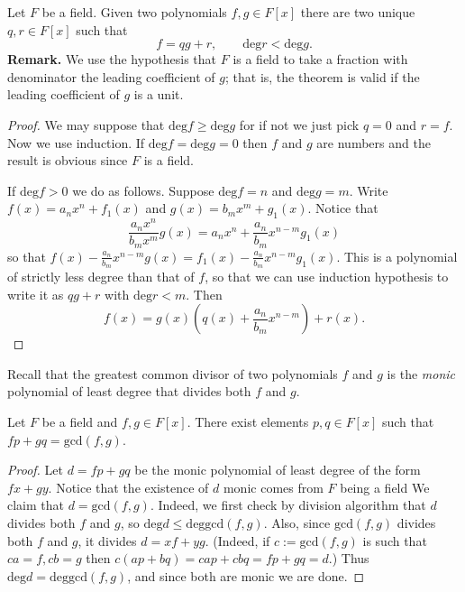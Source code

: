 \begin{theorem}
\label{theorem-division-algoritm-for-polynomials}
\begin{reference}
\cite[Theorem 1.48]{MMST}
\end{reference}
Let $F$ be a field. Given two polynomials $f,g \in F[x]$ there are two unique
$q,r \in F[x]$ such that
$$
f=qg+r,\qquad \text{deg}r<\text{deg}g.
$$
{\bf Remark.} We use the hypothesis that $F$ is a field to take a fraction with
denominator the leading coefficient of $g$; that is, the theorem is valid if the
leading coefficient of $g$ is a unit.
\end{theorem}

\begin{proof}
We may suppose that $\text{deg}f \geq \text{deg}g$ for if not we just pick
$q=0$ and $r=f$. Now we use induction. 
If $\text{deg}f=\text{deg}g=0$ then $f$ and $g$ are numbers and the result is
obvious since $F$ is a field.

If $\text{deg}f>0$ we do as follows. Suppose $\text{deg}f=n$ and
$\text{deg}g=m$. Write $f(x)=a_nx^n+f_1(x)$ and $g(x)=b_mx^m+g_1(x)$. Notice
that
$$
\frac{a_nx^n}{b_mx^m}g(x)=a_nx^n+\frac{a_n}{b_m}x^{n-m}g_1(x)
$$
so that $f(x)-\frac{a_n}{b_m}x^{n-m}g(x)=f_1(x)-\frac{a_n}{b_m}x^{n-m}g_1(x)$.
This is a polynomial of strictly less degree than that of $f$, so that we can
use induction hypothesis to write it as $qg+r$ with $\text{deg}r<m$. Then
$$
f(x)=g(x)\left(q(x)+\frac{a_n}{b_m}x^{n-m}\right)+r(x).
$$
\end{proof}

Recall that the greatest common divisor of two polynomials $f$ and $g$ 
is the {\it monic}
polynomial of least degree that divides both $f$ and $g$.

\begin{theorem}
\label{theorem-Bachet-Bezout-for-polynomials-over-field}
\begin{reference}
\cite[Theorem 1.53]{MMST}
\end{reference}
Let $F$ be a field and $f,g\in F[x]$. 
There exist elements  $p,q \in F[x]$ such that $fp+gq=\text{gcd}(f,g)$.
\end{theorem}

\begin{proof}
Let $d=fp+gq$ be the monic polynomial of least degree of the form $fx+gy$. 
Notice that the existence of $d$ monic comes from $F$ being a field
We claim that $d=\text{gcd}(f,g)$.  
Indeed, we first check by division algorithm
that $d$ divides both $f$ and $g$, so 
$\text{deg}d \leq \text{deg}\text{gcd}(f,g)$. Also, since
$\text{gcd}(f,g)$ divides both $f$ and $g$, it divides $d=xf+yg$. (Indeed, if
$c:=\text{gcd}(f,g)$ is such that $ca=f,cb=g$ then $c(ap+bq)=cap+cbq=fp+gq=d$.) 
Thus $\text{deg}d=\text{deg}\text{gcd}(f,g)$, and since both are monic we are
done.
\end{proof}

